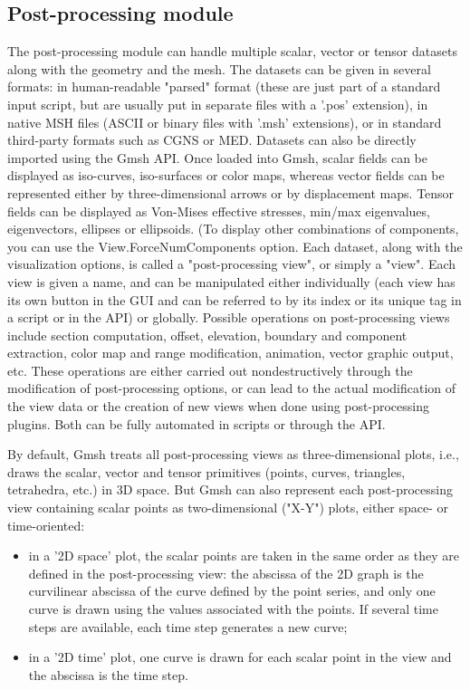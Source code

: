 \documentclass[dvipdfmx, 9pt, a4paper]{article}
\numberwithin{equation}{section}
\begin{document}
\subsection{Post-processing module}
The post-processing module can handle multiple scalar, vector or tensor datasets along with the geometry and the mesh. The datasets can be given in several formats: in human-readable "parsed" format (these are just part of a standard input script, but are usually put in separate files with a '.pos' extension), in native MSH files (ASCII or binary files with '.msh' extensions), or in standard third-party formats such as CGNS or MED. Datasets can also be directly imported using the Gmsh API. Once loaded into Gmsh, scalar fields can be displayed as iso-curves, iso-surfaces or color maps, whereas vector fields can be represented either by three-dimensional arrows or by displacement maps. Tensor fields can be displayed as Von-Mises effective stresses, min/max eigenvalues, eigenvectors, ellipses or ellipsoids. (To display other combinations of components, you can use the View.ForceNumComponents option. Each dataset, along with the visualization options, is called a "post-processing view", or simply a "view". Each view is given a name, and can be manipulated either individually (each view has its own button in the GUI and can be referred to by its index or its unique tag in a script or in the API) or globally. Possible operations on post-processing views include section computation, offset, elevation, boundary and component extraction, color map and range modification, animation, vector graphic output, etc. These operations are either carried out nondestructively through
the modification of post-processing options, or can lead to the actual modification of the view data or the creation of new views when done using post-processing plugins. Both can be fully automated in scripts or through the API.\par
By default, Gmsh treats all post-processing views as three-dimensional plots, i.e., draws the scalar, vector and tensor primitives (points, curves, triangles, tetrahedra, etc.) in 3D space. But Gmsh can also represent each post-processing view containing scalar points as two-dimensional ("X-Y") plots, either space- or time-oriented:
\begin{itemize}
\item in a '2D space' plot, the scalar points are taken in the same order as they are defined in the post-processing view: the abscissa of the 2D graph is the curvilinear abscissa of the curve defined by the point series, and only one curve is drawn using the values associated with the points. If several time steps are available, each time step generates a new curve;
\item in a '2D time' plot, one curve is drawn for each scalar point in the view and the abscissa is the time step.
\end{itemize}
\end{document}
